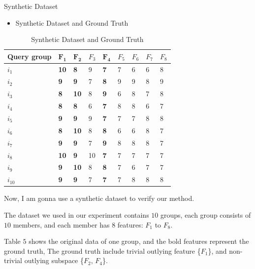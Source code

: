 \documentclass[
 size=14pt,
 paper=smartboard,  %
 mode=present, 		%
 display=slides, 	%
 style=tuliplab,  	%
 pauseslide,
 fleqn,leqno]{powerdot}
\begin{document}
\begin{slide}{Synthetic Dataset}

\begin{itemize}
\item Synthetic Dataset and Ground Truth
\end{itemize}

\begin{table}
\setlength{\abovecaptionskip}{0pt}
\setlength{\belowcaptionskip}{10pt}
\centering
\caption{Synthetic Dataset and Ground Truth}

\begin{tabular}{p{2.8cm}p{0.9cm}p{0.9cm}p{0.9cm}p{0.9cm}p{0.9cm}p{0.9cm}p{0.9cm}p{0.9cm}}
\hline
  Query group  & $\mathbf{F_1}$ & $\mathbf{F_2}$ & $F_3$ & $\mathbf{F_4}$ & $F_5$ & $F_6$ & $F_7$ & $F_8$\\
\hline
  $i_1$   & \bf{10} & \bf{8}  & 9  & \bf{7}  & 7 & 6 & 6  & 8\\
  $i_2$   & \bf{9}  & \bf{9}  & 7  & \bf{8}  & 9 & 9 & 8  & 9\\
  $i_3$   & \bf{8}  & \bf{10} & 8  & \bf{9}  & 6 & 8 & 7  & 8\\
  $i_4$   & \bf{8}  & \bf{8}  & 6  & \bf{7}  & 8 & 8 & 6  & 7\\
  $i_5$   & \bf{9}  & \bf{9}  & 9  & \bf{7}  & 7 & 7 & 8  & 8\\
  $i_6$   & \bf{8}  & \bf{10} & 8  & \bf{8}  & 6 & 6 & 8  & 7\\
  $i_7$   & \bf{9}  & \bf{9}  & 7  & \bf{9}  & 8 & 8 & 8  & 7\\
  $i_8$   & \bf{10} & \bf{9}  & 10 & \bf{7}  & 7 & 7 & 7  & 7\\
  $i_9$   & \bf{9}  & \bf{10} & 8  & \bf{8}  & 7 & 6 & 7  & 7\\
  $i_{10}$& \bf{9}  & \bf{9}  & 7  & \bf{7}  & 7 & 8 & 8  & 8\\
\hline
\end{tabular}
\end{table}

\begin{note}
Now,
I am gonna use a synthetic dataset to verify our method.

The dataset we used in our experiment contains $10$ groups,
each group consists of $10$ members,
and each member has $8$ features: $F_1$ to $F_8$.

Table $5$ shows the original data of one group,
and the bold features represent the ground truth,
The ground truth include trivial outlying feature \{$F_1$\},
and non-trivial outlying subspace \{$F_2$, $F_4$\}.
\end{note}

\end{slide}
\end{document}
